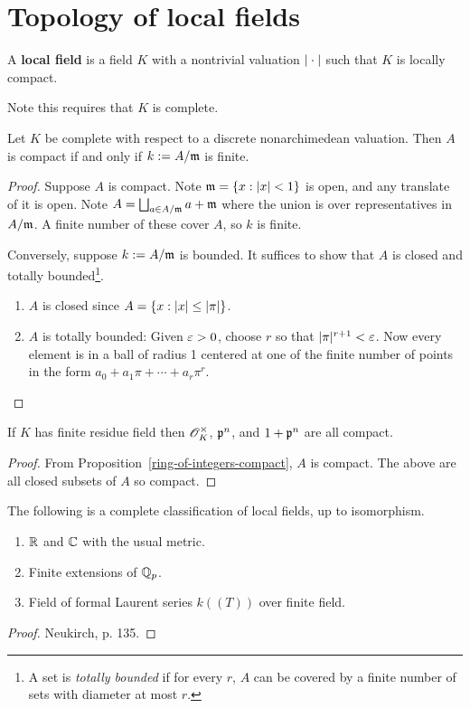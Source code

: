 \section{Topology of local fields}
\begin{df}
A \textbf{local field} is a field $K$ with a nontrivial valuation $|\cdot|$ such that $K$ is locally compact.
\end{df}
Note this requires that $K$ is complete.
\begin{pr}
Let $K$ be complete with respect to a discrete nonarchimedean valuation. Then $A$ is compact if and only if $k:=A/\mathfrak{m}$ is finite.
\end{pr}
\begin{proof}
Suppose $A$ is compact.
Note $\mathfrak{m}=\left\{{x}:{|x|<1}\right\}$ is open, and any translate of it is open. Note $A=\bigsqcup_{a\in A/\mathfrak{m}} a+\mathfrak{m}$ where the union is over representatives in $A/\mathfrak{m}$. A finite number of these cover $A$, so $k$ is finite.

Conversely, suppose $k:=A/\mathfrak{m}$ is bounded. It suffices to show that $A$ is closed and totally bounded\footnote{A set is {\it totally bounded} if for every $r$, $A$ can be covered by a finite number of sets with diameter at most $r$.}.
\begin{enumerate}
\item $A$ is closed since $A=\left\{{x}:{|x|\le |\pi|}\right\}$.
\item $A$ is totally bounded: Given $\varepsilon>0$, choose $r$ so that $|\pi|^{r+1}<\varepsilon$. Now every element is in a ball of radius 1 centered at one of the finite number of points in the form $a_0+a_1\pi+\cdots+a_r\pi^r$. \qedhere
\end{enumerate}
\end{proof}
\begin{pr}
If $K$ has finite residue field then $\mathscr{O}_K^{\times}$, $\mathfrak{p}^n$, and $1+\mathfrak{p}^n$ are all compact.
\end{pr}
\begin{proof}
From Proposition~\ref{ring-of-integers-compact}, $A$ is compact. The above are all closed subsets of $A$ so compact.
\end{proof}

\begin{thm}
The following is a complete classification of local fields, up to isomorphism.
\begin{enumerate}
\item $\mathbb{R}$ and $\mathbb{C}$ with the usual metric.
\item Finite extensions of $\mathbb{Q}_p$.
\item Field of formal Laurent series $k((T))$ over finite field.
\end{enumerate}
\end{thm}
\begin{proof}
Neukirch, p. 135.
\end{proof}
%
